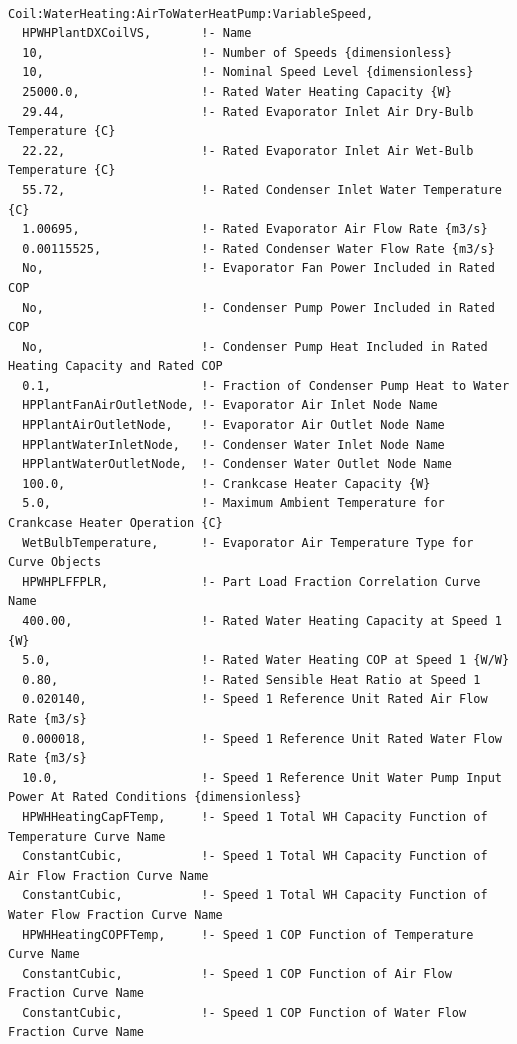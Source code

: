 \begin{lstlisting}

Coil:WaterHeating:AirToWaterHeatPump:VariableSpeed,
  HPWHPlantDXCoilVS,       !- Name
  10,                      !- Number of Speeds {dimensionless}
  10,                      !- Nominal Speed Level {dimensionless}
  25000.0,                 !- Rated Water Heating Capacity {W}
  29.44,                   !- Rated Evaporator Inlet Air Dry-Bulb Temperature {C}
  22.22,                   !- Rated Evaporator Inlet Air Wet-Bulb Temperature {C}
  55.72,                   !- Rated Condenser Inlet Water Temperature {C}
  1.00695,                 !- Rated Evaporator Air Flow Rate {m3/s}
  0.00115525,              !- Rated Condenser Water Flow Rate {m3/s}
  No,                      !- Evaporator Fan Power Included in Rated COP
  No,                      !- Condenser Pump Power Included in Rated COP
  No,                      !- Condenser Pump Heat Included in Rated Heating Capacity and Rated COP
  0.1,                     !- Fraction of Condenser Pump Heat to Water
  HPPlantFanAirOutletNode, !- Evaporator Air Inlet Node Name
  HPPlantAirOutletNode,    !- Evaporator Air Outlet Node Name
  HPPlantWaterInletNode,   !- Condenser Water Inlet Node Name
  HPPlantWaterOutletNode,  !- Condenser Water Outlet Node Name
  100.0,                   !- Crankcase Heater Capacity {W}
  5.0,                     !- Maximum Ambient Temperature for Crankcase Heater Operation {C}
  WetBulbTemperature,      !- Evaporator Air Temperature Type for Curve Objects
  HPWHPLFFPLR,             !- Part Load Fraction Correlation Curve Name
  400.00,                  !- Rated Water Heating Capacity at Speed 1 {W}
  5.0,                     !- Rated Water Heating COP at Speed 1 {W/W}
  0.80,                    !- Rated Sensible Heat Ratio at Speed 1
  0.020140,                !- Speed 1 Reference Unit Rated Air Flow Rate {m3/s}
  0.000018,                !- Speed 1 Reference Unit Rated Water Flow Rate {m3/s}
  10.0,                    !- Speed 1 Reference Unit Water Pump Input Power At Rated Conditions {dimensionless}
  HPWHHeatingCapFTemp,     !- Speed 1 Total WH Capacity Function of Temperature Curve Name
  ConstantCubic,           !- Speed 1 Total WH Capacity Function of Air Flow Fraction Curve Name
  ConstantCubic,           !- Speed 1 Total WH Capacity Function of Water Flow Fraction Curve Name
  HPWHHeatingCOPFTemp,     !- Speed 1 COP Function of Temperature Curve Name
  ConstantCubic,           !- Speed 1 COP Function of Air Flow Fraction Curve Name
  ConstantCubic,           !- Speed 1 COP Function of Water Flow Fraction Curve Name

\end{lstlisting}
